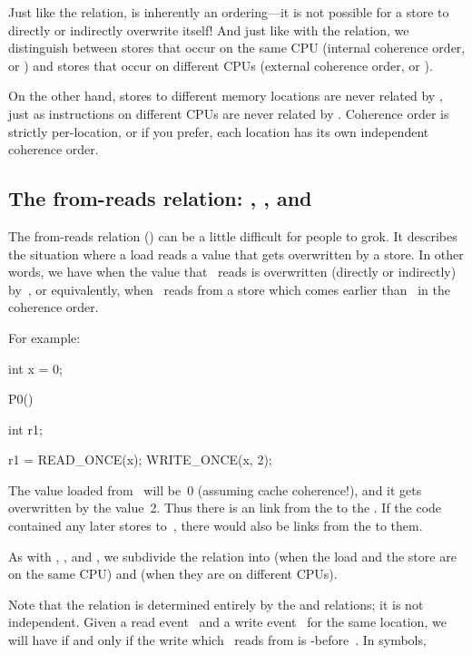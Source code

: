 Just like the  relation,  is inherently an
ordering---it is not possible for a store to directly or indirectly
overwrite itself!
And just like with the  relation, we distinguish between stores that
occur on the same CPU (internal coherence order, or ) and stores
that occur on different CPUs (external coherence order, or ).

On the other hand, stores to different memory locations are never
related by , just as instructions on different CPUs are never
related by .
Coherence order is strictly per-location, or if you prefer, each
location has its own independent coherence order.


\subsection{The from-reads relation: , , and }
\label{sec:docs:explanation:The From-reads Relation: fr, fri, and fre}

The from-reads relation () can be a little difficult for people to
grok.
It describes the situation where a load reads a value that gets
overwritten by a store.
In other words, we have  when the value that ~reads
is overwritten (directly or indirectly) by~, or equivalently,
when ~reads from a store which comes earlier than~ in
the coherence order.

For example:

\begin{VerbatimU}
	int x = 0;

	P0()
	{
		int r1;

		r1 = READ_ONCE(x);
		WRITE_ONCE(x, 2);
	}
\end{VerbatimU}

The value loaded from~ will be~0 (assuming cache coherence{!}), and it
gets overwritten by the value~2.
Thus there is an  link from the  to the
.
If the code contained any later stores to~, there would also be
 links from the  to them.

As with , , and , we subdivide the  relation
into  (when the load and the store are on the same CPU) and
 (when they are on different CPUs).

Note that the  relation is determined entirely by the  and
 relations; it is not independent.
Given a read event~ and a write event~ for the same
location, we will have  if and only if the write
which ~reads from is -before~.
In symbols,

